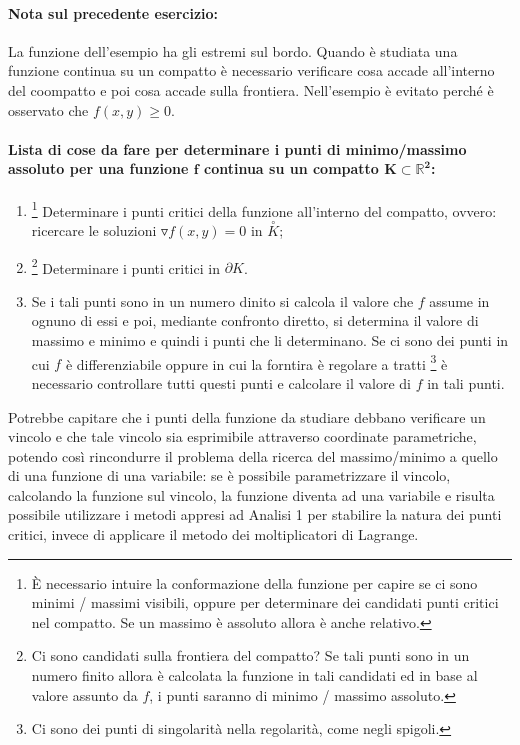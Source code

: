 \paragraph{Nota sul precedente esercizio:} La funzione dell'esempio ha gli estremi sul bordo. Quando è studiata una funzione continua su un compatto è necessario verificare cosa accade all'interno del coompatto e poi cosa accade sulla frontiera. Nell'esempio è evitato perché è osservato che $f(x,y)\geq 0$.

\paragraph{Lista di cose da fare per determinare i punti di minimo/massimo assoluto per una funzione $\boldsymbol f$ continua su un compatto $\boldsymbol{K\subset\mathbb{R}^2}$:}
\begin{enumerate}
	\item \footnote{È necessario intuire la conformazione della funzione per capire se ci sono minimi / massimi visibili, oppure per determinare dei candidati punti critici  nel compatto. Se un massimo è assoluto allora è anche relativo.} Determinare i punti critici della funzione all'interno del compatto, ovvero: ricercare le soluzioni $\triangledown f(x,y) = 0$ in $\overset{\circ}{K}$;
	\item \footnote{Ci sono candidati sulla frontiera del compatto? Se tali punti sono in un numero finito allora è calcolata la funzione in tali candidati ed in base al valore assunto da $f$, i punti saranno di minimo / massimo assoluto.} Determinare i punti critici in $\partial K$.
	\item Se i tali punti sono in un numero dinito si calcola il valore che $f$ assume in ognuno di essi e poi, mediante confronto diretto, si determina il valore di massimo e minimo e quindi i punti che li determinano. Se ci sono dei punti in cui $f$ è differenziabile oppure in cui la forntira è regolare a tratti \footnote{Ci sono dei punti di singolarità nella regolarità, come negli spigoli.} è necessario controllare tutti questi punti e calcolare il valore di $f$ in tali punti.
\end{enumerate}

Potrebbe capitare che i punti della funzione da studiare debbano verificare un vincolo e che tale vincolo sia esprimibile attraverso coordinate parametriche, potendo così rincondurre il problema della ricerca del massimo/minimo a quello di una funzione di una variabile: se è possibile parametrizzare il vincolo, calcolando la funzione sul vincolo, la funzione diventa ad una variabile e risulta possibile utilizzare i metodi appresi ad Analisi 1 per stabilire la natura dei punti critici, invece di applicare il metodo dei moltiplicatori di Lagrange.

